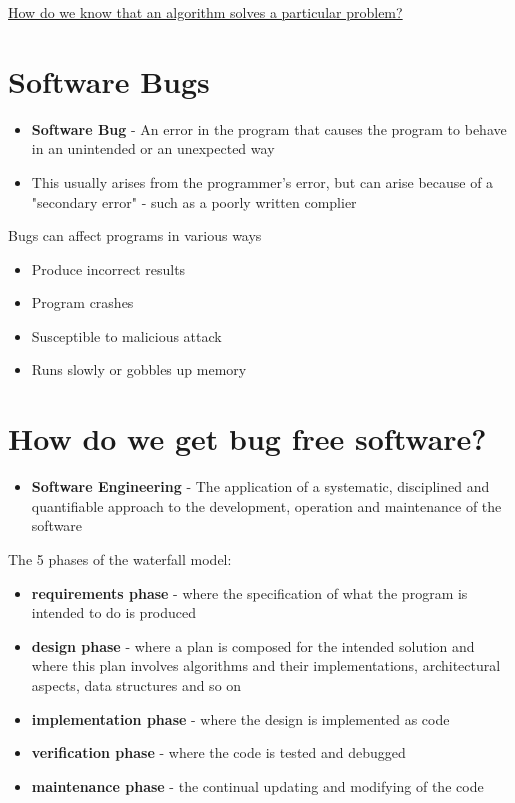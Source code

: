 \documentclass{article}[18pt]
\begin{document}
\begin{center}
\underline{\Large How do we know that an algorithm solves a particular problem?}
\end{center}
\section{Software Bugs}
\begin{itemize}
	\item \textbf{Software Bug} - An error in the program that causes the program to behave in an unintended or an unexpected way
	\item This usually arises from the programmer's error, but can arise because of a "secondary error" - such as a poorly written complier
\end{itemize}
Bugs can affect programs in various ways
\begin{itemize}
	\item Produce incorrect results
	\item Program crashes
	\item Susceptible to malicious attack
	\item Runs slowly or gobbles up memory
\end{itemize}
\section{How do we get bug free software?}
\begin{itemize}
	\item \textbf{Software Engineering} - The application of a systematic, disciplined and quantifiable approach to the development, operation and maintenance of the software
\end{itemize}
The 5 phases of the waterfall model:
\begin{itemize}
	\item \textbf{requirements phase} - where the specification of what the program is intended to do is produced
	\item \textbf{design phase} - where a plan is composed for the intended solution and where this plan involves algorithms and their implementations, architectural aspects, data structures and so on
	\item \textbf{implementation phase} - where the design is implemented as code
	\item \textbf{verification phase} - where the code is tested and debugged
	\item \textbf{maintenance phase} - the continual updating and modifying of the code
\end{itemize}
\end{document}
